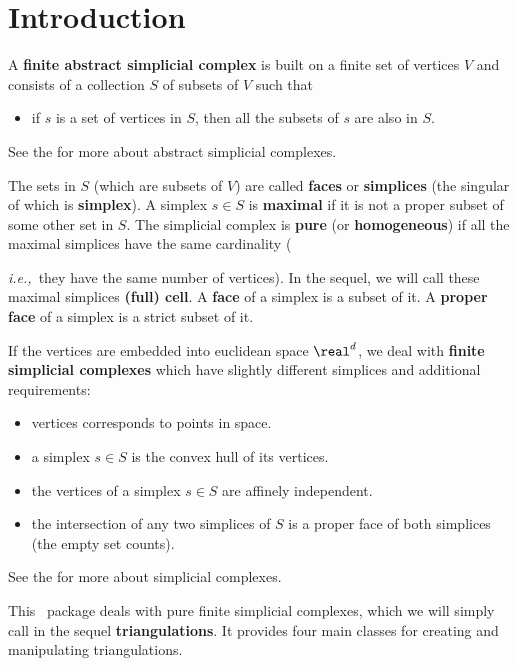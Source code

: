 {

\def\note#1{ {\color{red}
  \textsf{$\langle\!\langle${#1}$\rangle\!\rangle$}}
}

\section{Introduction\label{triangulation:intro}}

A \textbf{finite abstract simplicial complex} is built on a finite set of
vertices $V$ and consists of a collection $S$ of subsets of $V$ such that
\begin{itemize}
\item if $s$ is a set of vertices in $S$, then all the subsets of $s$ are also
in $S$.
\end{itemize}
See the
 for more about abstract simplicial complexes.

The sets in $S$ (which are subsets of $V$) are called
\textbf{faces} or \textbf{simplices} (the
singular of which is \textbf{simplex}).
%
A simplex $s\in S$ is \textbf{maximal} if it is not a proper subset of some other
set in $S$. The simplicial complex is \textbf{pure} (or \textbf{homogeneous})
if all the maximal simplices have the same cardinality ({\emph{i.e.,}\ they have the same
number of vertices). 
In the sequel, we will call these maximal simplices \textbf{(full) cell}.
A \textbf{face} of a simplex is a subset of it. A
\textbf{proper face} of a simplex is a strict subset of it.

If the vertices are embedded into euclidean space $\real^d$, we deal with
\textbf{finite simplicial complexes} which have slightly different simplices
and additional requirements:
\begin{itemize}
\item vertices corresponds to points in space.
\item a simplex $s\in S$ is the convex hull of its vertices.
\item the vertices of a simplex $s\in S$ are affinely independent.
\item the intersection of any two simplices of $S$ is a proper face of both
simplices (the empty set counts).
\end{itemize}
See the  for more about simplicial complexes.

This \cgal\ package deals with pure finite simplicial complexes, which
we will simply call in the sequel \textbf{triangulations}. It provides four main classes
for creating and manipulating triangulations.

}}
